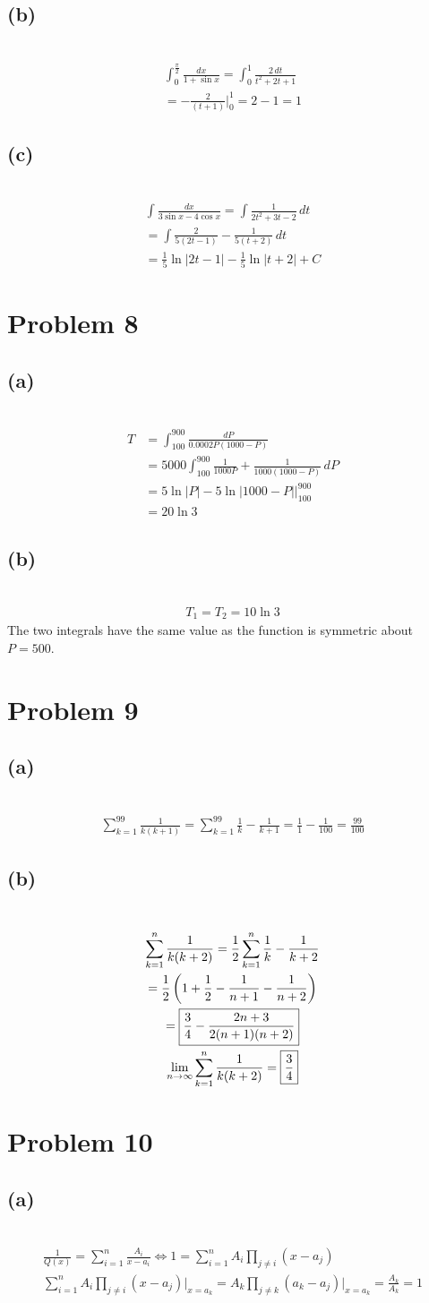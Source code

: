 \documentclass[12pt]{article}
\newcommand*{\paren}[1]{\ensuremath\left(#1\right)}
\newcommand{\problem}[1]{\section{Problem #1}}
\newcommand{\subproblem}[1]{\subsection{(#1)} \,}
\begin{document}
\subproblem{b}
\begin{gather*}
    \int_0^\frac{\pi}{2} \frac{dx}{1+\sin x } =  \int_0^1 \frac{2\, dt}{t^2+2t+1}\\
    = -\frac{2}{(t+1)} \Big|^1_0 = 2-1=\boxed{1}
\end{gather*}

\subproblem{c}
\begin{gather*}
    \int \frac{dx}{3\sin x -4\cos x} = \int \frac{1}{2t^2+3t-2} \, dt\\
    =\int \frac{2}{5(2t-1)} - \frac{1}{5(t+2)} \, dt\\
    = \boxed{ \frac{1}{5} \ln |2t-1| - \frac{1}{5} \ln |t+2|+C}
\end{gather*}

\problem{8}

\subproblem{a}
\begin{align*}
    T &= \int_{100}^{900} \frac{dP}{0.0002 P(1000-P)} \\
    &= 5000\int_{100}^{900} \frac{1}{1000P} +\frac{1}{1000(1000-P)} \,dP\\
    &= 5 \ln |P| - 5\ln |1000-P| \Big|^{900}_{100}\\
    &= \boxed{20 \ln 3}
\end{align*}

\subproblem{b}
\begin{gather*}
    T_1=T_2=10\ln 3
\end{gather*}
The two integrals have the same value as the function is symmetric about $P=500$.

\problem{9}

\subproblem{a}
\begin{gather*}
    \sum_{k=1}^{99} \frac{1}{k(k+1)}= \sum_{k=1}^{99} \frac{1}{k}- \frac{1}{k+1} = \frac{1}{1}-\frac{1}{100} = \boxed{\frac{99}{100}}
\end{gather*}

\subproblem{b}
\begin{gather*}
    \sum_{k=1}^{n} \frac{1}{k(k+2)} =  \frac{1}{2}\sum_{k=1}^{n} \frac{1}{k} - \frac{1}{k+2} \\
    =\frac{1}{2} \paren{1+\frac{1}{2}- \frac{1}{n+1}-\frac{1}{n+2}}\\
    = \boxed{\frac{3}{4}- \frac{2n+3}{2(n+1)(n+2)}}\\
    \lim_{n \to \infty} \sum_{k=1}^{n} \frac{1}{k(k+2)} = \boxed{\frac{3}{4}}
\end{gather*}

\problem{10}

\subproblem{a}
\begin{gather*}
    \frac{1}{Q(x)} = \sum_{i=1}^n \frac{A_i}{x-a_i}  \iff 1= \sum_{i=1}^n A_i\prod_{j \ne i} (x-a_j)\\
    \sum_{i=1}^n A_i \prod_{j \ne i} (x-a_j) \Big|_{x=a_k} = A_k \prod_{j \ne k} (a_k-a_j) \Big|_{x=a_k}=\frac{A_k}{A_k} = 1
\end{gather*}
\end{document}
